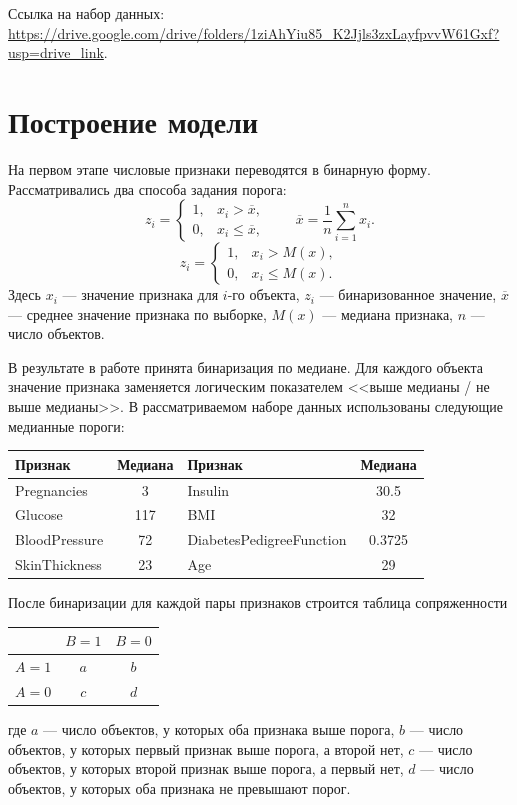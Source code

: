 \documentclass[a4paper, 14pt]{extarticle}
\begin{document}
Ссылка на набор данных:
\url{https://drive.google.com/drive/folders/1ziAhYiu85_K2Jjls3zxLayfpvvW61Gxf?usp=drive_link}.

\section{Построение модели}

На первом этапе числовые признаки переводятся в бинарную форму. Рассматривались два способа задания порога:
\[
z_i =
\begin{cases}
1, & x_i > \overline{x},\\
0, & x_i \le \overline{x},
\end{cases}
\qquad
\overline{x} = \frac{1}{n}\sum_{i=1}^{n}x_i.
\]
\[
z_i =
\begin{cases}
1, & x_i > M(x),\\
0, & x_i \le M(x).
\end{cases}
\]
Здесь $x_i$ --- значение признака для $i$-го объекта, $z_i$ --- бинаризованное значение, $\overline{x}$ --- среднее значение признака по выборке, $M(x)$ --- медиана признака, $n$ --- число объектов.

В результате в работе принята бинаризация по медиане. Для каждого объекта значение признака заменяется логическим показателем <<выше медианы / не выше медианы>>. В рассматриваемом наборе данных использованы следующие медианные пороги:
\begin{center}
\begin{tabular}{|l|c|l|c|}
\hline
Признак & Медиана & Признак & Медиана \\
\hline
Pregnancies & 3 & Insulin & 30.5 \\
Glucose & 117 & BMI & 32 \\
BloodPressure & 72 & DiabetesPedigreeFunction & 0.3725 \\
SkinThickness & 23 & Age & 29 \\
\hline
\end{tabular}
\end{center}

После бинаризации для каждой пары признаков строится таблица сопряженности
\begin{center}
\begin{tabular}{|c|c|c|}
  \hline
   & $B = 1$ & $B = 0$ \\
  \hline
  $A = 1$ & $a$ & $b$ \\
  \hline
  $A = 0$ & $c$ & $d$ \\
  \hline
\end{tabular}
\end{center}
где $a$ --- число объектов, у которых оба признака выше порога, $b$ --- число объектов, у которых первый признак выше порога, а второй нет, $c$ --- число объектов, у которых второй признак выше порога, а первый нет, $d$ --- число объектов, у которых оба признака не превышают порог.
\end{document}
